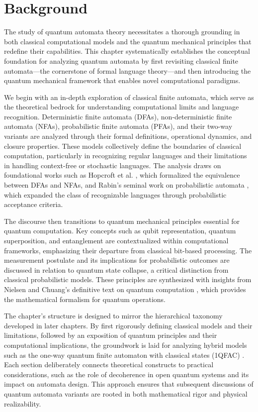 \chapter{Background}  

The study of quantum automata theory necessitates a thorough grounding in both classical computational models and the quantum mechanical principles that redefine their capabilities. This chapter systematically establishes the conceptual foundation for analyzing quantum automata by first revisiting classical finite automata—the cornerstone of formal language theory—and then introducing the quantum mechanical framework that enables novel computational paradigms.

We begin with an in-depth exploration of classical finite automata, which serve as the theoretical bedrock for understanding computational limits and language recognition. Deterministic finite automata (DFAs), non-deterministic finite automata (NFAs), probabilistic finite automata (PFAs), and their two-way variants are analyzed through their formal definitions, operational dynamics, and closure properties. These models collectively define the boundaries of classical computation, particularly in recognizing regular languages and their limitations in handling context-free or stochastic languages. The analysis draws on foundational works such as Hopcroft et al. \cite{hopcroft2006introduction}, which formalized the equivalence between DFAs and NFAs, and Rabin's seminal work on probabilistic automata \cite{rabin1963probabilistic}, which expanded the class of recognizable languages through probabilistic acceptance criteria.

The discourse then transitions to quantum mechanical principles essential for quantum computation. Key concepts such as qubit representation, quantum superposition, and entanglement are contextualized within computational frameworks, emphasizing their departure from classical bit-based processing. The measurement postulate and its implications for probabilistic outcomes are discussed in relation to quantum state collapse, a critical distinction from classical probabilistic models. These principles are synthesized with insights from Nielsen and Chuang's definitive text on quantum computation \cite{nielsen2010quantum}, which provides the mathematical formalism for quantum operations.

The chapter's structure is designed to mirror the hierarchical taxonomy developed in later chapters. By first rigorously defining classical models and their limitations, followed by an exposition of quantum principles and their computational implications, the groundwork is laid for analyzing hybrid models such as the one-way quantum finite automaton with classical states (1QFAC) \cite{zheng2012one}. Each section deliberately connects theoretical constructs to practical considerations, such as the role of decoherence in open quantum systems \cite{breuer2002theory} and its impact on automata design. This approach ensures that subsequent discussions of quantum automata variants are rooted in both mathematical rigor and physical realizability.



